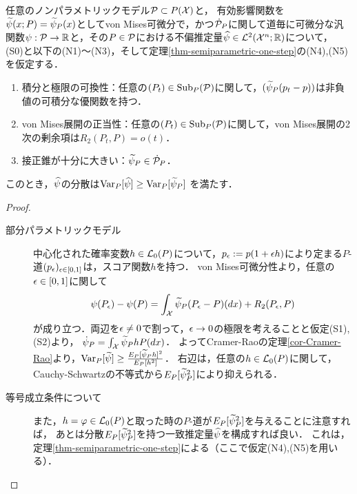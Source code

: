 \documentclass[uplatex, dvipdfmx]{jsarticle}
\newcommand{\Sub}{\mathrm{Sub}}
\begin{document}
\begin{theorem}[ノンパラメトリック一致推定量の最小分散]\label{thm-semiparametric-efficient-asymptotic-variance}
    任意のノンパラメトリックモデル$\P\subset P(\X)$と，
    有効影響関数を$\wt{\psi}(x;P)=\wt{\psi}_P(x)$としてvon Mises可微分で，かつ$\dot{\P}_P$に関して道毎に可微分な汎関数$\psi:\P\to\R$と，その$P\in\P$における不偏推定量$\wh{\psi}\in\L^2(\X^n;\R)$について，
    (S0)と以下の(N1)〜(N3)，そして定理\ref{thm-semiparametric-one-step}の(N4),(N5)を仮定する．
    \begin{enumerate}[({N}1)]
        \item 積分と極限の可換性：任意の$(P_t)\in\Sub_P(\P)$に関して，$(\wt{\psi}_P(p_t-p))$は非負値の可積分な優関数を持つ．
        \item von Mises展開の正当性：任意の$(P_t)\in\Sub_P(\P)$に関して，von Mises展開の2次の剰余項は$R_2(P_t,P)=o(t)$．
        \item 接正錐が十分に大きい：$\wt{\psi}_P\in\dot{\P}_P$．
    \end{enumerate}
    このとき，$\wh{\psi}$の分散は$\Var_P[\wh{\psi}]\ge\Var_P[\wt{\psi}_P]$
    を満たす．
\end{theorem}
\begin{proof}\mbox{}
    \begin{description}
        \item[部分パラメトリックモデル] 中心化された確率変数$h\in\L_0(P)$について，$p_\ep:=p(1+\ep h)$により定まる$P$-道$(p_\ep)_{\ep\in[0,1]}$は，スコア関数$h$を持つ．
        von Mises可微分性より，任意の$\ep\in[0,1]$に関して
        \[\psi(P_\ep)-\psi(P)=\int_\X\wt{\psi}_P(P_\ep-P)(dx)+R_2(P_\ep,P)\]
        が成り立つ．両辺を$\ep\ne0$で割って，$\ep\to0$の極限を考えることと仮定(S1),(S2)より，
        $\dot{\psi}_P=\int_\X\wt{\psi}_P hP(dx)$．
        よってCramer-Raoの定理\ref{cor-Cramer-Rao}より，$\Var_P[\wt{\psi}]\ge\frac{E_P[\wt{\psi}_Ph]^2}{E_P[h^2]}$．
        右辺は，任意の$h\in\L_0(P)$に関して，Cauchy-Schwartzの不等式から$E_P[\wt{\psi}_P^2]$により抑えられる．
        \item[等号成立条件について] 
        また，$h=\varphi\in\L_0(P)$と取った時の$P$-道が$E_P[\wt{\psi}_P^2]$を与えることに注意すれば，
        あとは分散$E_P[\wt{\psi}_P^2]$を持つ一致推定量$\wh{\psi}$を構成すれば良い．
        これは，定理\ref{thm-semiparametric-one-step}による（ここで仮定(N4),(N5)を用いる）．
    \end{description}
\end{proof}
\end{document}
